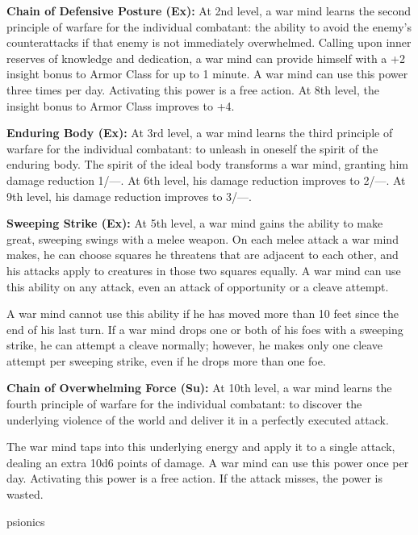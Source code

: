 {\textbf{Chain of Defensive Posture (Ex):} At 2nd level, a war mind learns the second principle of warfare for the individual combatant: the ability to avoid the enemy’s counterattacks if that enemy is not immediately overwhelmed. Calling upon inner reserves of knowledge and dedication, a war mind can provide himself with a +2 insight bonus to Armor Class for up to 1 minute. A war mind can use this power three times per day. Activating this power is a free action. At 8th level, the insight bonus to Armor Class improves to +4.

\textbf{Enduring Body (Ex):} At 3rd level, a war mind learns the third principle of warfare for the individual combatant: to unleash in oneself the spirit of the enduring body. The spirit of the ideal body transforms a war mind, granting him damage reduction 1/---. At 6th level, his damage reduction improves to 2/---. At 9th level, his damage reduction improves to 3/---.

\textbf{Sweeping Strike (Ex):} At 5th level, a war mind gains the ability to make great, sweeping swings with a melee weapon. On each melee attack a war mind makes, he can choose squares he threatens that are adjacent to each other, and his attacks apply to creatures in those two squares equally. A war mind can use this ability on any attack, even an attack of opportunity or a cleave attempt.

A war mind cannot use this ability if he has moved more than 10 feet since the end of his last turn. If a war mind drops one or both of his foes with a sweeping strike, he can attempt a cleave normally; however, he makes only one cleave attempt per sweeping strike, even if he drops more than one foe.

\textbf{Chain of Overwhelming Force (Su):} At 10th level, a war mind learns the fourth principle of warfare for the individual combatant: to discover the underlying violence of the world and deliver it in a perfectly executed attack.

The war mind taps into this underlying energy and apply it to a single attack, dealing an extra 10d6 points of damage. A war mind can use this power once per day. Activating this power is a free action. If the attack misses, the power is wasted.
}
{}
{psionics}
{}
{}
{}